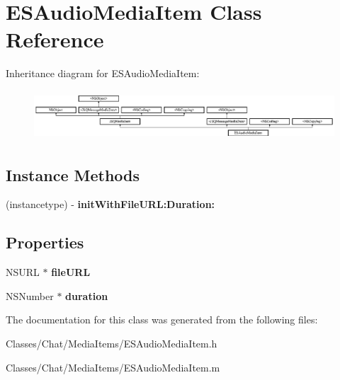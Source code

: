 \hypertarget{interface_e_s_audio_media_item}{}\section{E\+S\+Audio\+Media\+Item Class Reference}
\label{interface_e_s_audio_media_item}
Inheritance diagram for E\+S\+Audio\+Media\+Item\+:\begin{figure}[H]
\begin{center}
\leavevmode
\includegraphics[height=1.871345cm]{interface_e_s_audio_media_item}
\end{center}
\end{figure}
\subsection*{Instance Methods}
\begin{DoxyCompactItemize}
\item 
\hypertarget{interface_e_s_audio_media_item_a1ee659d6f006e2d5527908f6835bb14c}{}(instancetype) -\/ {\bfseries init\+With\+File\+U\+R\+L\+:\+Duration\+:}\label{interface_e_s_audio_media_item_a1ee659d6f006e2d5527908f6835bb14c}

\end{DoxyCompactItemize}
\subsection*{Properties}
\begin{DoxyCompactItemize}
\item 
\hypertarget{interface_e_s_audio_media_item_aeb6bcd70c3c54ab2000005c8de970045}{}N\+S\+U\+R\+L $\ast$ {\bfseries file\+U\+R\+L}\label{interface_e_s_audio_media_item_aeb6bcd70c3c54ab2000005c8de970045}

\item 
\hypertarget{interface_e_s_audio_media_item_acab8253f6f707e4c306702aac610b24a}{}N\+S\+Number $\ast$ {\bfseries duration}\label{interface_e_s_audio_media_item_acab8253f6f707e4c306702aac610b24a}

\end{DoxyCompactItemize}


The documentation for this class was generated from the following files\+:\begin{DoxyCompactItemize}
\item 
Classes/\+Chat/\+Media\+Items/E\+S\+Audio\+Media\+Item.\+h\item 
Classes/\+Chat/\+Media\+Items/E\+S\+Audio\+Media\+Item.\+m\end{DoxyCompactItemize}
